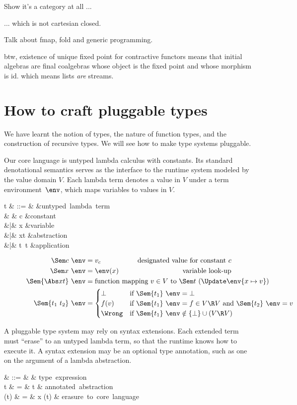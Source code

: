\documentclass{amsart}
\begin{document}
Show it's a category at all ...

... which is not cartesian closed.

Talk about fmap, fold and generic programming.

btw, existence of unique fixed point for contractive functors
means that initial algebras are final coalgebras whose object is
the fixed point and whose morphism is id. which means lists
\emph{are} streams.



\section{How to craft pluggable types}
\label{howto}

We have learnt the notion of types, the nature of function types,
and the construction of recursive types. We will see how to make
type systems pluggable.

Our core language is untyped lambda calculus with constants. Its
standard denotational semantics serves as the interface to the
runtime system modeled by the value domain $V$. Each lambda term
denotes a value in $V$ under a term environment~$\env$, which
maps variables to values in $V$.

\begin{syntax}
t & ::= & &\mbox{untyped lambda term} \\
& & c &\mbox{constant} \\
&|& x &\mbox{variable} \\
&|& \Abs xt &\mbox{abstraction} \\
&|& t~t &\mbox{application}
\end{syntax}
%
\begin{align*}
\Sem c~\env &= v_c & \mbox{designated value for constant }c\\
\Sem x~\env &= \env(x) & \mbox{variable look-up}\\
\Sem{\Abs x t}~\env &=
\rlap{function mapping $v\in V$ to $\Sem t~(\Update\env{x\mapsto v})$}\\
\Sem{t_1~t_2}~\env &=
\begin{cases}
\bot&\rlap{if $\Sem{t_1}~\env=\bot$}\\
f(v)&\rlap{if $\Sem{t_1}~\env=f\in V\R V$ and $\Sem{t_2}~\env=v$}\\
\Wrong&\rlap{if $\Sem{t_1}~\env\notin \{\bot\}\cup(V\R V)$}
\end{cases}
\end{align*}

A pluggable type system may rely on syntax extensions. Each
extended term must ``erase'' to an untyped lambda term, so that
the runtime knows how to execute it. A syntax extension may be an
optional type annotation, such as one on the argument of a lambda
abstraction.
\begin{syntax}
\sigma & ::= & \cdots & \mbox{type expression}\\
t & \+= & t & \mbox{annotated abstraction}\\
\Erase(t) & = & \Abs x \Erase(t) &
\mbox{erasure to core language}
\end{syntax}
\end{document}
